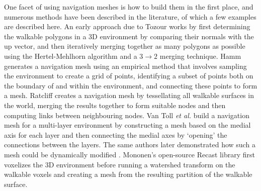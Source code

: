 \documentclass[10pt,twocolumn]{article}
\begin{document}
One facet of using navigation meshes is how to build them in the first place, and numerous methods have been described in the literature, of which a few examples are described here. An early approach due to Tozour \cite{tozour02} works by first determining the walkable polygons in a 3D environment by comparing their normals with the up vector, and then iteratively merging together as many polygons as possible using the Hertel-Mehlhorn algorithm \cite{hertel83,orourke94} and a $3 \rightarrow 2$ merging technique. Hamm \cite{hamm08} generates a navigation mesh using an empirical method that involves sampling the environment to create a grid of points, identifying a subset of points both on the boundary of and within the environment, and connecting these points to form a mesh. Ratcliff \cite{ratcliff08} creates a navigation mesh by tessellating all walkable surfaces in the world, merging the results together to form suitable nodes and then computing links between neighbouring nodes. Van Toll \emph{et al.} \cite{vantoll11} build a navigation mesh for a multi-layer environment by constructing a mesh based on the medial axis for each layer and then connecting the medial axes by `opening' the connections between the layers. The same authors later demonstrated how such a mesh could be dynamically modified \cite{vantoll12}. Mononen's open-source Recast library \cite{mononen09} first voxelizes the 3D environment before running a watershed transform \cite{beucher90,gonzalez02} on the walkable voxels and creating a mesh from the resulting partition of the walkable surface.

\end{document}
